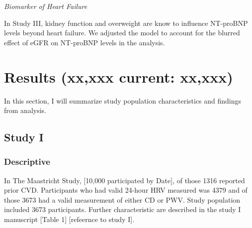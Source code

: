 \documentclass[
  a4paper,
  headsepline=true,
  open=any]{scrbook}
\begin{document}
\emph{Biomarker of Heart Failure}

In Study III, kidney function and overweight are know to influence
NT-proBNP levels beyond heart failure. We adjusted the model to account
for the blurred effect of eGFR on NT-proBNP levels in the analysis.


\hypertarget{results-xxxxx-current-xxxxx}{%
\chapter{Results (xx,xxx current:
xx,xxx)}\label{results-xxxxx-current-xxxxx}}

In this section, I will summarize study population characteristics and
findings from analysis.

\hypertarget{study-i}{%
\section{Study I}\label{study-i}}

\hypertarget{descriptive}{%
\subsection{Descriptive}\label{descriptive}}

In The Maastricht Study, {[}10,000 participated by Date{]}, of those
1316 reported prior CVD. Participants who had valid 24-hour HRV measured
was 4379 and of those 3673 had a valid measurement of either CD or PWV.
Study population included 3673 participants. Further characteristic are
described in the study I manuscript {[}Table 1{]} {[}refeernce to study
I{]}.
\end{document}
